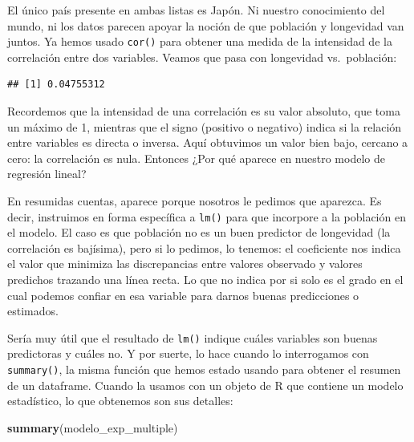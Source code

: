 \documentclass[spanish,]{book}
\newenvironment{Shaded}{\begin{snugshade}}{\end{snugshade}}
\newcommand{\DecValTok}[1]{\textcolor[rgb]{0.00,0.00,0.81}{#1}}
\newcommand{\KeywordTok}[1]{\textcolor[rgb]{0.13,0.29,0.53}{\textbf{#1}}}
\newcommand{\NormalTok}[1]{#1}
\newcommand{\OperatorTok}[1]{\textcolor[rgb]{0.81,0.36,0.00}{\textbf{#1}}}
\begin{document}
El único país presente en ambas listas es Japón. Ni nuestro conocimiento del mundo, ni los datos parecen apoyar la noción de que población y longevidad van juntos. Ya hemos usado \texttt{cor()} para obtener una medida de la intensidad de la correlación entre dos variables. Veamos que pasa con longevidad vs.~población:

\begin{Shaded}
\end{Shaded}

\begin{verbatim}
## [1] 0.04755312
\end{verbatim}

Recordemos que la intensidad de una correlación es su valor absoluto, que toma un máximo de 1, mientras que el signo (positivo o negativo) indica si la relación entre variables es directa o inversa. Aquí obtuvimos un valor bien bajo, cercano a cero: la correlación es nula. Entonces ¿Por qué aparece en nuestro modelo de regresión lineal?

En resumidas cuentas, aparece porque nosotros le pedimos que aparezca. Es decir, instruimos en forma específica a \texttt{lm()} para que incorpore a la población en el modelo. El caso es que población no es un buen predictor de longevidad (la correlación es bajísima), pero si lo pedimos, lo tenemos: el coeficiente nos indica el valor que minimiza las discrepancias entre valores observado y valores predichos trazando una línea recta. Lo que no indica por si solo es el grado en el cual podemos confiar en esa variable para darnos buenas predicciones o estimados.

Sería muy útil que el resultado de \texttt{lm()} indique cuáles variables son buenas predictoras y cuáles no. Y por suerte, lo hace cuando lo interrogamos con \texttt{summary()}, la misma función que hemos estado usando para obtener el resumen de un dataframe. Cuando la usamos con un objeto de R que contiene un modelo estadístico, lo que obtenemos son sus detalles:

\begin{Shaded}
\begin{Highlighting}[]
\KeywordTok{summary}\NormalTok{(modelo_exp_multiple)}
\end{Highlighting}
\end{Shaded}
\end{document}

